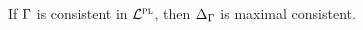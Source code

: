 %




\begin{Lthm} \label{lemma:PL-max}
  If $\Gamma$ is consistent in $\mathcal{L}^{\textsc{pl}}$, then $\Delta_{\Gamma}$ is maximal consistent. 
\end{Lthm} \vspace{-.2in}

